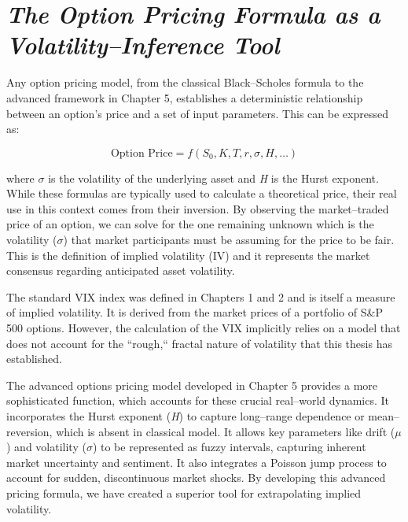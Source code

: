 \documentclass[12pt,a4paper]{report}
\numberwithin{equation}{section}
\begin{document}
\hypertarget{the--option--pricing--formula--as--a--volatility--inference--tool}{%
\section{\texorpdfstring{\emph{\textbf{The Option Pricing Formula as
a Volatility--Inference
Tool}}}{The Option Pricing Formula as a Volatility--Inference Tool}}\label{the--option--pricing--formula--as--a--volatility--inference--tool}}

Any option pricing model, from the classical Black--Scholes formula to
the advanced framework in Chapter 5, establishes a deterministic
relationship between an option's price and a set of input parameters.
This can be expressed as:

\[
\text{Option Price} = f(S_0, K, T, r, \sigma, H, \dots)
\]


where \emph{$\sigma$} is the volatility of the underlying asset and \emph{H} is
the Hurst exponent. While these formulas are typically used to calculate
a theoretical price, their real use in this context comes from their
inversion. By observing the market--traded price of an option, we can
solve for the one remaining unknown which is the volatility (\emph{$\sigma$})
that market participants must be assuming for the price to be fair. This
is the definition of implied volatility (IV) and it represents the
market consensus regarding anticipated asset volatility.

The standard VIX index was defined in Chapters 1 and 2 and is itself a
measure of implied volatility. It is derived from the market prices of a
portfolio of S\&P 500 options. However, the calculation of the VIX
implicitly relies on a model that does not account for the ``rough,``
fractal nature of volatility that this thesis has established.

The advanced options pricing model developed in Chapter 5 provides a
more sophisticated function, which accounts for these crucial real--world
dynamics. It incorporates the Hurst exponent (\emph{H}) to capture
long--range dependence or mean--reversion, which is absent in classical
model. It allows key parameters like drift (\emph{$\mu$}) and volatility
(\emph{$\sigma$}) to be represented as fuzzy intervals, capturing inherent
market uncertainty and sentiment. It also integrates a Poisson jump
process to account for sudden, discontinuous market shocks. By
developing this advanced pricing formula, we have created a superior
tool for extrapolating implied volatility.
\end{document}
